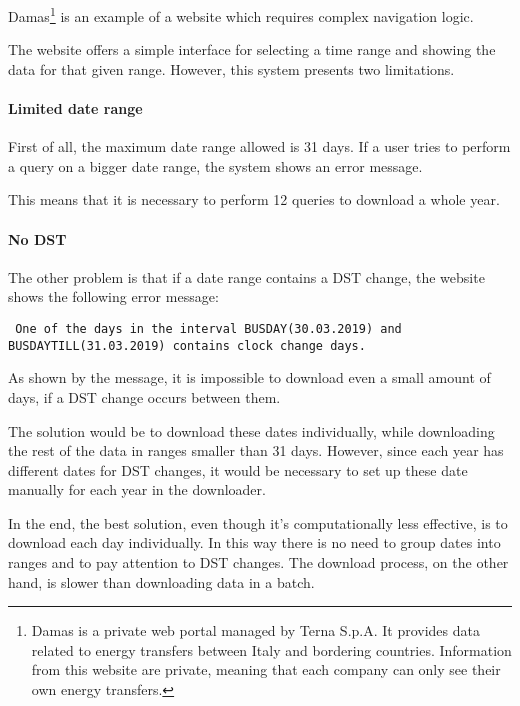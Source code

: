 Damas\footnote{
    Damas is a private web portal managed by Terna S.p.A.
    It provides data related to energy transfers between Italy and bordering countries.
    Information from this website are private, meaning that each company can only see their own energy transfers.
} is an example of a website which requires complex navigation logic.

The website offers a simple interface for selecting a time range and showing the data for that given range.
However, this system presents two limitations.

\paragraph{Limited date range}
    First of all, the maximum date range allowed is 31 days.
    If a user tries to perform a query on a bigger date range, the system shows an error message.
    
    This means that it is necessary to perform 12 queries to download a whole year.

\paragraph{No DST}
    The other problem is that if a date range contains a DST change, the website shows the following error message:

    \begin{center}
        \texttt{
            One of the days in the interval BUSDAY(30.03.2019) and\\ BUSDAYTILL(31.03.2019) contains clock change days.
        }
    \end{center}
    
    As shown by the message, it is impossible to download even a small amount of days, if a DST change occurs between them.

    The solution would be to download these dates individually, while downloading the rest of the data in ranges smaller than 31 days.
    However, since each year has different dates for DST changes, it would be necessary to set up these date manually for each year in the downloader.
    
    In the end, the best solution, even though it's computationally less effective, is to download each day individually.
    In this way there is no need to group dates into ranges and to pay attention to DST changes.
    The download process, on the other hand, is slower than downloading data in a batch.
